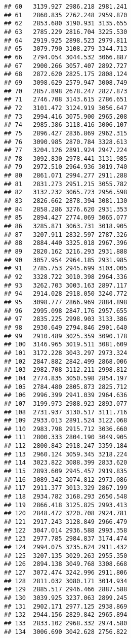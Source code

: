 \documentclass[
]{article}
\begin{document}
\begin{verbatim}
## 60   3139.927 2986.218 2981.241
## 61   2860.835 2762.248 2959.870
## 62   2853.680 3190.931 3135.655
## 63   2785.229 2816.704 3225.530
## 64   2919.925 2898.523 2979.811
## 65   3079.790 3108.279 3344.713
## 66   2794.054 3044.532 3066.887
## 67   2900.266 3057.407 2892.727
## 68   2872.620 2825.175 2808.124
## 69   3098.629 2579.947 3008.749
## 70   2857.898 2678.247 2827.873
## 71   2746.708 3143.615 2786.651
## 72   3101.472 3124.919 3056.647
## 73   2994.416 3075.900 2965.208
## 74   2985.386 3118.416 3006.107
## 75   2896.427 2836.869 2962.315
## 76   3090.985 2870.784 3328.613
## 77   3204.126 2891.924 2947.224
## 78   3092.830 2978.441 3131.985
## 79   2972.510 2964.936 3019.740
## 80   2861.071 2994.277 2911.288
## 81   2831.273 2951.215 3055.782
## 82   3132.232 3065.723 2956.598
## 83   2826.662 2878.394 3081.130
## 84   2858.286 3276.620 2931.353
## 85   2894.427 2774.069 3065.077
## 86   3285.871 3063.731 3018.905
## 87   3207.911 2832.597 2787.326
## 88   2884.440 3325.018 2967.396
## 89   2820.162 3216.293 2931.888
## 90   3057.954 2964.185 2931.985
## 91   2785.753 2945.699 3103.005
## 92   3328.722 3010.398 2964.336
## 93   3262.703 3003.163 2897.117
## 94   2914.028 2918.050 3240.772
## 95   3098.777 2866.969 2884.898
## 96   2995.098 2847.176 2957.655
## 97   2835.225 2998.903 3133.386
## 98   2930.649 2794.846 2901.640
## 99   2910.489 3025.359 3090.178
## 100  3146.965 3019.511 3081.609
## 101  3172.228 3043.297 2973.324
## 102  2847.882 2842.499 2868.006
## 103  2982.708 3112.211 2998.812
## 104  2774.835 3050.598 2854.197
## 105  2784.480 2805.873 2825.712
## 106  2996.399 2941.039 2964.636
## 107  3199.973 2988.923 2893.077
## 108  2731.937 3130.517 3111.716
## 109  2933.013 2891.524 3122.068
## 110  2983.798 2915.712 3036.660
## 111  2800.333 2804.190 3049.905
## 112  2800.843 2918.247 3359.184
## 113  2960.124 3059.345 3218.224
## 114  3023.822 3088.399 2833.620
## 115  2893.609 2945.457 2919.835
## 116  3089.342 3074.812 2973.086
## 117  2911.377 3013.329 2867.199
## 118  2934.782 3168.293 2650.548
## 119  2866.418 3125.825 2993.413
## 120  2848.472 3220.708 2924.781
## 121  2917.243 3128.849 2966.479
## 122  3047.014 2936.588 2993.358
## 123  2977.785 2984.837 3174.474
## 124  2994.075 3235.624 2911.432
## 125  3207.135 3029.263 2955.350
## 126  2894.138 3049.768 3308.668
## 127  3072.474 3242.996 2911.806
## 128  2811.032 3080.171 3014.934
## 129  2885.517 2946.466 2887.588
## 130  3039.925 3237.063 2899.245
## 131  2902.171 2977.125 2938.869
## 132  2944.156 2829.842 2965.894
## 133  2833.102 2968.332 2974.580
## 134  3006.690 3042.628 2756.822

\end{verbatim}
\end{document}
